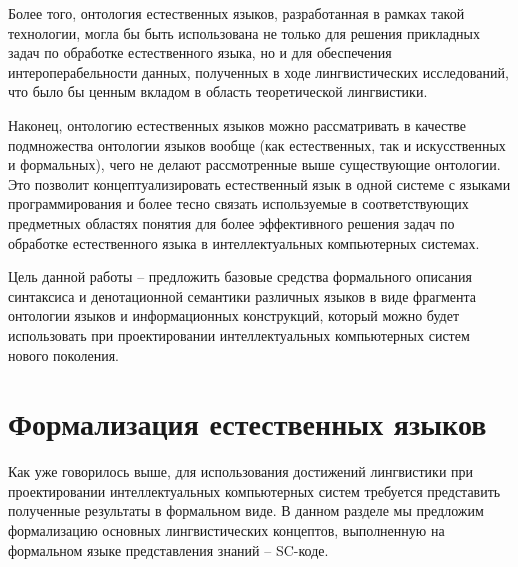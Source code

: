 Более того, онтология естественных языков, разработанная в рамках такой технологии, могла бы быть использована не только для решения прикладных задач по обработке естественного языка, но и для обеспечения интероперабельности данных, полученных в ходе лингвистических исследований, что было бы ценным вкладом в область теоретической лингвистики.

Наконец, онтологию естественных языков можно рассматривать в качестве подмножества онтологии языков вообще (как естественных, так и искусственных и формальных), чего не делают рассмотренные выше существующие онтологии. Это позволит концептуализировать естественный язык в одной системе с языками программирования и более тесно связать используемые в соответствующих предметных областях понятия для более эффективного решения задач по обработке естественного языка в интеллектуальных компьютерных системах.

Цель данной работы -- предложить базовые средства формального описания синтаксиса и денотационной семантики различных языков в виде фрагмента онтологии языков и информационных конструкций, который можно будет использовать при проектировании интеллектуальных компьютерных систем нового поколения.

\section{Формализация естественных языков}

Как уже говорилось выше, для использования достижений лингвистики при проектировании интеллектуальных компьютерных систем требуется представить полученные результаты в формальном виде. В данном разделе мы предложим формализацию основных лингвистических концептов, выполненную на формальном языке представления знаний -- SC-коде.

